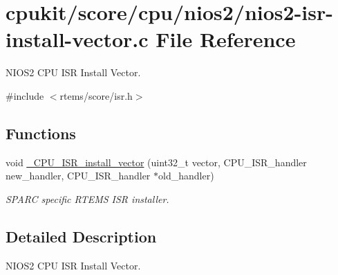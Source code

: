 \hypertarget{nios2-isr-install-vector_8c}{}\section{cpukit/score/cpu/nios2/nios2-\/isr-\/install-\/vector.c File Reference}
\label{nios2-isr-install-vector_8c}


N\+I\+O\+S2 C\+PU I\+SR Install Vector.  


{\ttfamily \#include $<$rtems/score/isr.\+h$>$}\newline
\subsection*{Functions}
\begin{DoxyCompactItemize}
\item 
void \mbox{\hyperlink{group__RTEMSScoreCPUARM_gaa3480454768ad843ce97909111a48a1f}{\+\_\+\+C\+P\+U\+\_\+\+I\+S\+R\+\_\+install\+\_\+vector}} (uint32\+\_\+t vector, C\+P\+U\+\_\+\+I\+S\+R\+\_\+handler new\+\_\+handler, C\+P\+U\+\_\+\+I\+S\+R\+\_\+handler $\ast$old\+\_\+handler)
\begin{DoxyCompactList}\small\item\em S\+P\+A\+RC specific R\+T\+E\+MS I\+SR installer. \end{DoxyCompactList}\end{DoxyCompactItemize}


\subsection{Detailed Description}
N\+I\+O\+S2 C\+PU I\+SR Install Vector. 

